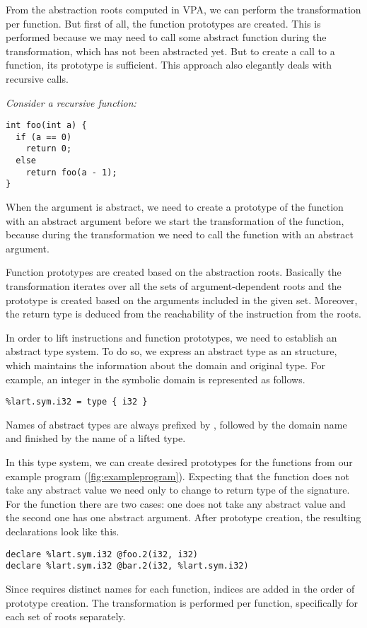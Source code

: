 From the abstraction roots computed in VPA, we can perform the transformation per
function. But first of all, the function prototypes are created. This is performed because we may need to call some abstract function during the transformation, which has not been abstracted yet. But to create a call to a function, its prototype is sufficient. This approach also elegantly deals with recursive calls.
\begin{marginfigure}
\itshape
Consider a recursive function:
\begin{verbatim}
int foo(int a) {
  if (a == 0)
    return 0;
  else
    return foo(a - 1);
}
\end{verbatim}
    When the argument  is abstract, we need to create a prototype of
    the function  with an abstract argument before we start the
    transformation of the function, because during the transformation we need to
    call the function  with an abstract argument.
\end{marginfigure}

Function prototypes are created based on the abstraction roots. Basically
the transformation iterates over all the sets of argument-dependent roots and
the prototype is created based on the arguments included in the given set.
Moreover, the return type is deduced from the reachability of the  instruction
from the roots.

In order to lift \LLVM instructions and function prototypes, we need to
establish an abstract type system. To do so, we express an abstract type as an
\LLVM structure, which maintains the information about the domain and original
type. For example, an integer in the symbolic domain is represented as follows.

\begin{verbatim}
%lart.sym.i32 = type { i32 }
\end{verbatim}

Names of abstract types are always prefixed by , followed by the
domain name and finished by the name of a lifted \LLVM type.

In this type system, we can create desired prototypes for the functions from our
example program (\autoref{fig:exampleprogram}). Expecting that the function 
does not take any abstract value we need only to change to return type of the
signature. For the function  there are two cases: one does not take any
abstract value and the second one has one abstract argument. After prototype
creation, the resulting \LLVM declarations look like this.
\begin{verbatim}
declare %lart.sym.i32 @foo.2(i32, i32)
declare %lart.sym.i32 @bar.2(i32, %lart.sym.i32)
\end{verbatim}
Since \LLVM requires distinct names for each function, indices are added in
the order of prototype creation. The transformation is performed per function,
specifically for each set of roots separately.

